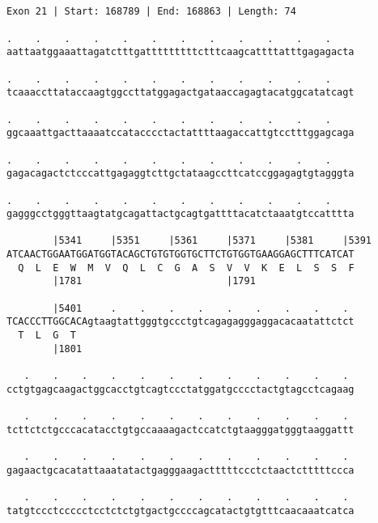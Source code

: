 \documentclass{article}
\begin{document}
\begin{Verbatim}
                                                       
 
Exon 21 | Start: 168789 | End: 168863 | Length: 74
 
.    .    .    .    .    .    .    .    .    .    .    .    
aattaatggaaattagatctttgatttttttttctttcaagcattttatttgagagacta
                                                            
.    .    .    .    .    .    .    .    .    .    .    .    
tcaaaccttataccaagtggccttatggagactgataaccagagtacatggcatatcagt
                                                            
.    .    .    .    .    .    .    .    .    .    .    .    
ggcaaattgacttaaaatccatacccctactattttaagaccattgtcctttggagcaga
                                                            
.    .    .    .    .    .    .    .    .    .    .    .    
gagacagactctcccattgagaggtcttgctataagccttcatccggagagtgtagggta
                                                            
.    .    .    .    .    .    .    .    .    .    .    .    
gagggcctgggttaagtatgcagattactgcagtgattttacatctaaatgtccatttta
                                                            
        |5341     |5351     |5361     |5371     |5381     |5391
ATCAACTGGAATGGATGGTACAGCTGTGTGGTGCTTCTGTGGTGAAGGAGCTTTCATCAT
  Q  L  E  W  M  V  Q  L  C  G  A  S  V  V  K  E  L  S  S  F
        |1781                         |1791                 
  
        |5401     .    .    .    .    .    .    .    .    . 
TCACCCTTGGCACAgtaagtattgggtgccctgtcagagagggaggacacaatattctct
  T  L  G  T                                                
        |1801                                               
  
   .    .    .    .    .    .    .    .    .    .    .    . 
cctgtgagcaagactggcacctgtcagtccctatggatgcccctactgtagcctcagaag
                                                            
   .    .    .    .    .    .    .    .    .    .    .    . 
tcttctctgcccacatacctgtgccaaaagactccatctgtaagggatgggtaaggattt
                                                            
   .    .    .    .    .    .    .    .    .    .    .    . 
gagaactgcacatattaaatatactgagggaagactttttccctctaactctttttccca
                                                            
   .    .    .    .    .    .    .    .    .    .    .    . 
tatgtccctccccctcctctctgtgactgccccagcatactgtgtttcaacaaatcatca
                                                            

\end{Verbatim}
\end{document}
